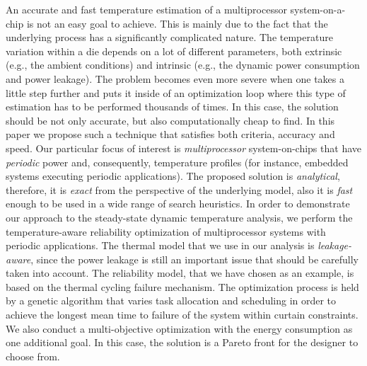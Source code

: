   An accurate and fast temperature estimation of a multiprocessor system-on-a-chip is not an easy goal to achieve. This is mainly due to the fact that the underlying process has a significantly complicated nature. The temperature variation within a die depends on a lot of different parameters, both extrinsic (e.g., the ambient conditions) and intrinsic (e.g., the dynamic power consumption and power leakage). The problem becomes even more severe when one takes a little step further and puts it inside of an optimization loop where this type of estimation has to be performed thousands of times. In this case, the solution should be not only accurate, but also computationally cheap to find. In this paper we propose such a technique that satisfies both criteria, accuracy and speed.
  Our particular focus of interest is \emph{multiprocessor} system-on-chips that have \emph{periodic} power and, consequently, temperature profiles (for instance, embedded systems executing periodic applications). The proposed solution is \emph{analytical}, therefore, it is \emph{exact} from the perspective of the underlying model, also it is \emph{fast} enough to be used in a wide range of search heuristics. In order to demonstrate our approach to the steady-state dynamic temperature analysis, we perform the temperature-aware reliability optimization of multiprocessor systems with periodic applications.
  The thermal model that we use in our analysis is \emph{leakage-aware}, since the power leakage is still an important issue that should be carefully taken into account. The reliability model, that we have chosen as an example, is based on the thermal cycling failure mechanism.
  The optimization process is held by a genetic algorithm that varies task allocation and scheduling in order to achieve the longest mean time to failure of the system within curtain constraints. We also conduct a multi-objective optimization with the energy consumption as one additional goal. In this case, the solution is a Pareto front for the designer to choose from.
